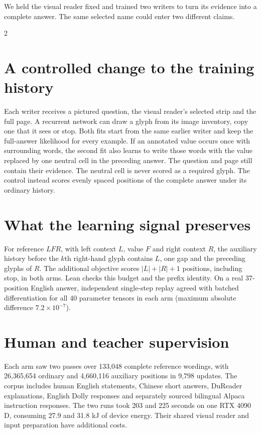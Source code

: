 \noindent We held the visual reader fixed and trained two writers to turn its evidence into a complete answer. The same selected name could enter two different claims.
\begin{multicols}{2}
\section*{A controlled change to the training history}
Each writer receives a pictured question, the visual reader's selected strip and the full page. A recurrent network can draw a glyph from its image inventory, copy one that it sees or stop. Both fits start from the same earlier writer and keep the full-answer likelihood for every example. If an annotated value occurs once with surrounding words, the second fit also learns to write those words with the value replaced by one neutral cell in the preceding answer. The question and page still contain their evidence. The neutral cell is never scored as a required glyph. The control instead scores evenly spaced positions of the complete answer under its ordinary history.
\section*{What the learning signal preserves}
For reference $LFR$, with left context $L$, value $F$ and right context $R$, the auxiliary history before the $k$th right-hand glyph contains $L$, one gap and the preceding glyphs of $R$. The additional objective scores $|L|+|R|+1$ positions, including stop, in both arms. Lean checks this budget and the prefix identity. On a real 37-position English answer, independent single-step replay agreed with batched differentiation for all 40 parameter tensors in each arm (maximum absolute difference $7.2\times10^{-7}$).
\section*{Human and teacher supervision}
Each arm saw two passes over 133,048 complete reference wordings, with 26,365,654 ordinary and 4,660,116 auxiliary positions in 9,798 updates. The corpus includes human English statements, Chinese short answers, DuReader explanations, English Dolly responses and separately sourced bilingual Alpaca instruction responses. The two runs took 203 and 225 seconds on one RTX 4090 D, consuming 27.9 and 31.8 kJ of device energy. Their shared visual reader and input preparation have additional costs.
\end{multicols}
